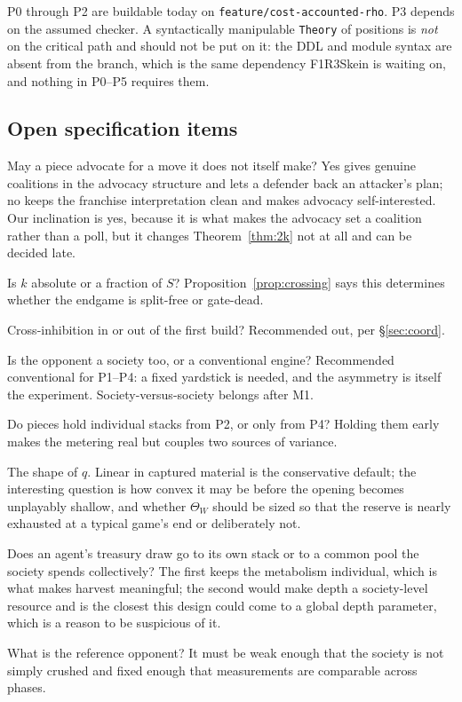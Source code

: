 \documentclass[11pt,a4paper]{article}
\theoremstyle{plain}
\theoremstyle{definition}
\theoremstyle{remark}
\begin{document}
P0 through P2 are buildable today on
\texttt{feature/cost-accounted-rho}. P3 depends on the assumed checker. A
syntactically manipulable \texttt{Theory} of positions is \emph{not} on the
critical path and should not be put on it: the DDL and module syntax are absent
from the branch, which is the same dependency F1R3Skein is waiting on, and
nothing in P0--P5 requires them.

\subsection{Open specification items}
\label{sec:openspec}

\begin{description}[leftmargin=1.6em,style=nextline]
\item[S1] May a piece advocate for a move it does not itself make? Yes gives
genuine coalitions in the advocacy structure and lets a defender back an
attacker's plan; no keeps the franchise interpretation clean and makes advocacy
self-interested. Our inclination is yes, because it is what makes the advocacy
set a coalition rather than a poll, but it changes Theorem~\ref{thm:2k} not at
all and can be decided late.
\item[S2] Is $k$ absolute or a fraction of $S$? Proposition~\ref{prop:crossing}
says this determines whether the endgame is split-free or gate-dead.
\item[S3] Cross-inhibition in or out of the first build? Recommended out, per
\S\ref{sec:coord}.
\item[S4] Is the opponent a society too, or a conventional engine? Recommended
conventional for P1--P4: a fixed yardstick is needed, and the asymmetry is
itself the experiment. Society-versus-society belongs after M1.
\item[S5] Do pieces hold individual stacks from P2, or only from P4? Holding
them early makes the metering real but couples two sources of variance.
\item[S7] The shape of $q$. Linear in captured material is the conservative
default; the interesting question is how convex it may be before the opening
becomes unplayably shallow, and whether $\Theta_W$ should be sized so that the
reserve is nearly exhausted at a typical game's end or deliberately not.
\item[S8] Does an agent's treasury draw go to its own stack or to a common pool
the society spends collectively? The first keeps the metabolism individual,
which is what makes harvest meaningful; the second would make depth a
society-level resource and is the closest this design could come to a global
depth parameter, which is a reason to be suspicious of it.
\item[S6] What is the reference opponent? It must be weak enough that the
society is not simply crushed and fixed enough that measurements are
comparable across phases.
\end{description}
\end{document}
